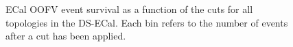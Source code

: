 \begin{figure}
\begin{minipage}{.5\linewidth}
\end{minipage}%
\begin{minipage}{.5\linewidth}
\centering
{}
\end{minipage}\par\medskip
\caption{ECal OOFV event survival as a function of the cuts for all topologies in the DS-ECal.  Each bin refers to the number of events after a cut has been applied.}
\label{fig:SelOOFVEventSurvivalDS}
\end{figure}
\newline
\newline
